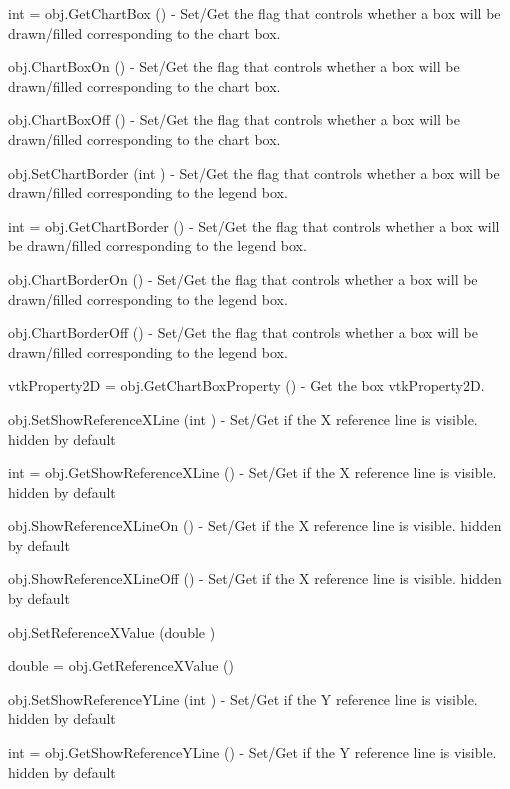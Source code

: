 \begin{DoxyItemize}
\item {\ttfamily int = obj.\-Get\-Chart\-Box ()} -\/ Set/\-Get the flag that controls whether a box will be drawn/filled corresponding to the chart box.  
\item {\ttfamily obj.\-Chart\-Box\-On ()} -\/ Set/\-Get the flag that controls whether a box will be drawn/filled corresponding to the chart box.  
\item {\ttfamily obj.\-Chart\-Box\-Off ()} -\/ Set/\-Get the flag that controls whether a box will be drawn/filled corresponding to the chart box.  
\item {\ttfamily obj.\-Set\-Chart\-Border (int )} -\/ Set/\-Get the flag that controls whether a box will be drawn/filled corresponding to the legend box.  
\item {\ttfamily int = obj.\-Get\-Chart\-Border ()} -\/ Set/\-Get the flag that controls whether a box will be drawn/filled corresponding to the legend box.  
\item {\ttfamily obj.\-Chart\-Border\-On ()} -\/ Set/\-Get the flag that controls whether a box will be drawn/filled corresponding to the legend box.  
\item {\ttfamily obj.\-Chart\-Border\-Off ()} -\/ Set/\-Get the flag that controls whether a box will be drawn/filled corresponding to the legend box.  
\item {\ttfamily vtk\-Property2\-D = obj.\-Get\-Chart\-Box\-Property ()} -\/ Get the box vtk\-Property2\-D.  
\item {\ttfamily obj.\-Set\-Show\-Reference\-X\-Line (int )} -\/ Set/\-Get if the X reference line is visible. hidden by default  
\item {\ttfamily int = obj.\-Get\-Show\-Reference\-X\-Line ()} -\/ Set/\-Get if the X reference line is visible. hidden by default  
\item {\ttfamily obj.\-Show\-Reference\-X\-Line\-On ()} -\/ Set/\-Get if the X reference line is visible. hidden by default  
\item {\ttfamily obj.\-Show\-Reference\-X\-Line\-Off ()} -\/ Set/\-Get if the X reference line is visible. hidden by default  
\item {\ttfamily obj.\-Set\-Reference\-X\-Value (double )}  
\item {\ttfamily double = obj.\-Get\-Reference\-X\-Value ()}  
\item {\ttfamily obj.\-Set\-Show\-Reference\-Y\-Line (int )} -\/ Set/\-Get if the Y reference line is visible. hidden by default  
\item {\ttfamily int = obj.\-Get\-Show\-Reference\-Y\-Line ()} -\/ Set/\-Get if the Y reference line is visible. hidden by default  

\end{DoxyItemize}
